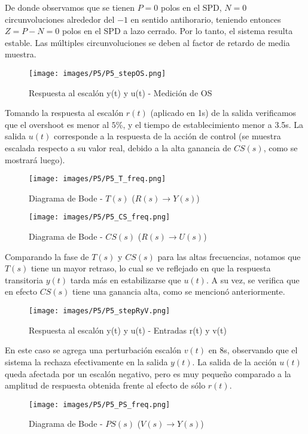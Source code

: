 \documentclass[ca_tp2_main.tex]{subfiles}
\begin{document}
De donde observamos que se tienen $P=0$ polos en el SPD, $N=0$ circunvoluciones alrededor del $-1$ en sentido antihorario, teniendo entonces $Z=P-N=0$ polos en el SPD a lazo cerrado. Por lo tanto, el sistema resulta estable. Las múltiples circunvoluciones se deben al factor de retardo de media muestra.

\begin{figure}[H]
\centering
\texttt{[image: images/P5/P5\_stepOS.png]}
\caption{Respuesta al escalón y(t) y u(t) - Medición de OS}
\end{figure}

Tomando la respuesta al escalón $r(t)$ (aplicado en 1s) de la salida verificamos que el overshoot es menor al $5\%$, y el tiempo de establecimiento menor a 3.5s. La salida $u(t)$ corresponde a la respuesta de la acción de control (se muestra escalada respecto a su valor real, debido a la alta ganancia de $CS(s)$, como se mostrará luego).

\begin{figure}[H]
\centering
\texttt{[image: images/P5/P5\_T\_freq.png]}
\caption{Diagrama de Bode - $T(s)$ ($R(s) \rightarrow Y(s)$)}
\end{figure}

\begin{figure}[H]
\centering
\texttt{[image: images/P5/P5\_CS\_freq.png]}
\caption{Diagrama de Bode - $CS(s)$ ($R(s) \rightarrow U(s)$)}
\end{figure}

Comparando la fase de $T(s)$ y $CS(s)$ para las altas frecuencias, notamos que $T(s)$ tiene un mayor retraso, lo cual se ve reflejado en que la respuesta transitoria $y(t)$ tarda más en estabilizarse que $u(t)$. A su vez, se verifica que en efecto $CS(s)$ tiene una ganancia alta, como se mencionó anteriormente.

\begin{figure}[H]
\centering
\texttt{[image: images/P5/P5\_stepRyV.png]}
\caption{Respuesta al escalón y(t) y u(t) - Entradas r(t) y v(t)}
\end{figure}

En este caso se agrega una perturbación escalón $v(t)$ en 8s, observando que el sistema la rechaza efectivamente en la salida $y(t)$. La salida de la acción $u(t)$ queda afectada por un escalón negativo, pero es muy pequeño comparado a la amplitud de respuesta obtenida frente al efecto de sólo $r(t)$.

\begin{figure}[H]
\centering
\texttt{[image: images/P5/P5\_PS\_freq.png]}
\caption{Diagrama de Bode - $PS(s)$ ($V(s) \rightarrow Y(s)$)}
\end{figure}
\end{document}

